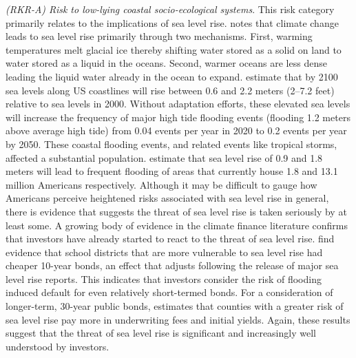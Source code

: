 \textit{(RKR-A) Risk to low-lying coastal socio-ecological systems}. This risk category primarily relates to the implications of sea level rise. \cite{lindsey2022climate} notes that climate change leads to sea level rise primarily through two mechanisms. First, warming temperatures melt glacial ice thereby shifting water stored as a solid on land to water stored as a liquid in the oceans. Second, warmer oceans are less dense leading the liquid water already in the ocean to expand. \cite{sweet2022global} estimate that by 2100 sea levels along US coastlines will rise between 0.6 and 2.2 meters (2--7.2 feet) relative to sea levels in 2000. Without adaptation efforts, these elevated sea levels will increase the frequency of major high tide flooding events (flooding 1.2 meters above average high tide) from 0.04 events per year in 2020 to 0.2 events per year by 2050. These coastal flooding events, and related events like tropical storms, affected a substantial population. \cite{hauer2016millions} estimate that sea level rise of 0.9 and 1.8 meters will lead to frequent flooding of areas that currently house 1.8 and 13.1 million Americans respectively. Although it may be difficult to gauge how Americans perceive heightened risks associated with sea level rise in general, there is evidence that suggests the threat of sea level rise is taken seriously by at least some. A growing body of evidence in the climate finance literature confirms that investors have already started to react to the threat of sea level rise. \cite{goldsmith2019sea} find evidence that school districts that are more vulnerable to sea level rise had cheaper 10-year bonds, an effect that adjusts following the release of major sea level rise reports. This indicates that investors consider the risk of flooding induced default for even relatively short-termed bonds. For a consideration of longer-term, 30-year public bonds, \cite{painter2020inconvenient} estimates that counties with a greater risk of sea level rise pay more in underwriting fees and initial yields. Again, these results suggest that the threat of sea level rise is significant and increasingly well understood by investors. 

